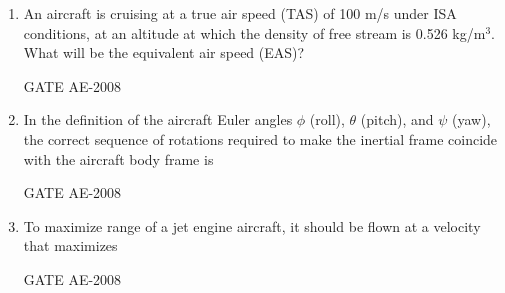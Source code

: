 \documentclass[journal,12pt,onecolumn]{IEEEtran}
\theoremstyle{remark}
\begin{document}
\begin{enumerate}
    \quad

    \item An aircraft is cruising at a true air speed (TAS) of 100 m/s under ISA conditions, at an altitude at which the density of free stream is 0.526 kg/m$^3$. What will be the equivalent air speed (EAS)?\\
    \begin{enumerate}
    \end{enumerate}
    \hfill{GATE AE-2008}

    \quad

\item In the definition of the aircraft Euler angles $\phi$ (roll), $\theta$ (pitch), and $\psi$ (yaw), the correct sequence of rotations required to make the inertial frame coincide with the aircraft body frame is  \\
\begin{enumerate}
\end{enumerate}
    \hfill{GATE AE-2008}

    \quad

\item To maximize range of a jet engine aircraft, it should be flown at a velocity that maximizes  \\
\begin{enumerate}
\end{enumerate}
    \hfill{GATE AE-2008}


\end{enumerate}
\end{document}
